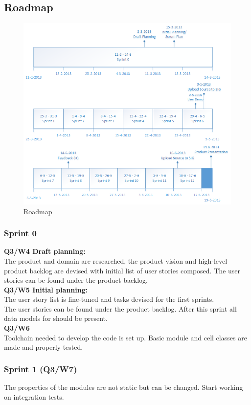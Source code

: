 \documentclass[10pt,a4paper]{report}
\begin{document}
		\subsection{Roadmap}
			\begin{figure}[htb]
			\centerline{\includegraphics[scale=1]{Roadmap.png}}
			\caption{Roadmap}
			\label{fig: Roadmap}
			\end{figure}	
			\subsubsection*{Sprint 0}
				\textbf{Q3/W4 Draft planning:}\\ The product and domain are researched, the product vision and high-level product backlog are devised with initial list of user stories composed. The user stories can be found under the product backlog.\\
				\textbf{Q3/W5 Initial planning:}\\ The user story list is fine-tuned and tasks devised for the first sprints.\\
				The user stories can be found under the product backlog. After this sprint all data models for should be present.\\		
				\textbf{Q3/W6}\\
				Toolchain needed to develop the code is set up. Basic module and cell classes are made and properly tested.
			\subsubsection*{Sprint 1 (Q3/W7)}
				The properties of the modules are not static but can be changed. Start working on integration tests.
\end{document}
